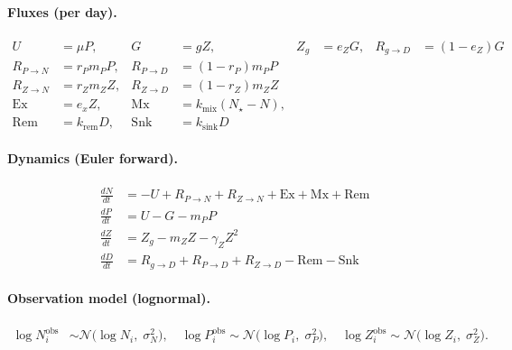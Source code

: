 \paragraph{Fluxes (per day).}
\begin{align}
U &= \mu P,& G &= g Z,& Z_g &= e_Z G,& R_{g\to D} &= (1-e_Z)G\\
R_{P\to N} &= r_P m_P P,& R_{P\to D} &= (1-r_P)m_P P\\
R_{Z\to N} &= r_Z m_Z Z,& R_{Z\to D} &= (1-r_Z)m_Z Z\\
\mathrm{Ex} &= e_x Z,& \mathrm{Mx} &= k_{\text{mix}}(N_\star - N),\\
\mathrm{Rem} &= k_{\text{rem}} D,& \mathrm{Snk} &= k_{\text{sink}} D
\end{align}

\paragraph{Dynamics (Euler forward).}
\begin{align}
\frac{dN}{dt} &= -U + R_{P\to N} + R_{Z\to N} + \mathrm{Ex} + \mathrm{Mx} + \mathrm{Rem} \\
\frac{dP}{dt} &= U - G - m_P P \\
\frac{dZ}{dt} &= Z_g - m_Z Z - \gamma_Z Z^2 \\
\frac{dD}{dt} &= R_{g\to D} + R_{P\to D} + R_{Z\to D} - \mathrm{Rem} - \mathrm{Snk}
\end{align}

\paragraph{Observation model (lognormal).}
\begin{align}
\log N^{\text{obs}}_i &\sim \mathcal{N}\big(\log N_i,\; \sigma_N^2\big),\quad
\log P^{\text{obs}}_i \sim \mathcal{N}\big(\log P_i,\; \sigma_P^2\big),\quad
\log Z^{\text{obs}}_i \sim \mathcal{N}\big(\log Z_i,\; \sigma_Z^2\big).
\end{align}

